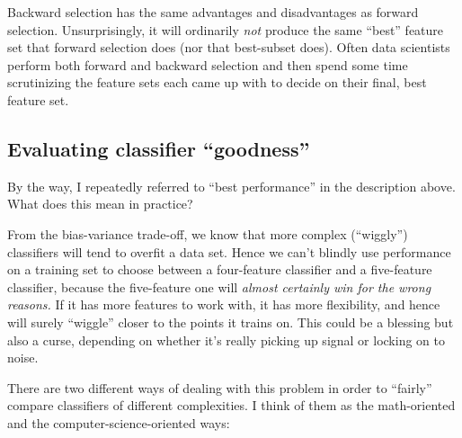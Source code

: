 Backward selection has the same advantages and disadvantages as forward
selection. Unsurprisingly, it will ordinarily \textit{not} produce the same
``best'' feature set that forward selection does (nor that best-subset does).
Often data scientists perform both forward and backward selection and then
spend some time scrutinizing the feature sets each came up with to decide on
their final, best feature set.

\subsection{Evaluating classifier ``goodness''}

By the way, I repeatedly referred to ``best performance'' in the description
above. What does this mean in practice? 


From the bias-variance trade-off, we know that more complex (``wiggly'')
classifiers will tend to overfit a data set. Hence we can't blindly use
performance on a training set to choose between a four-feature classifier and a
five-feature classifier, because the five-feature one will \textit{almost
certainly win for the wrong reasons.} If it has more features to work with, it
has more flexibility, and hence will surely ``wiggle'' closer to the points it
trains on. This could be a blessing but also a curse, depending on whether it's
really picking up signal or locking on to noise.

There are two different ways of dealing with this problem in order to
``fairly'' compare classifiers of different complexities. I think of them as
the math-oriented and the computer-science-oriented ways:

